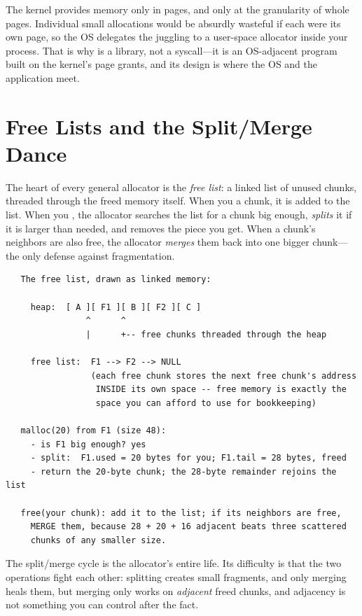 \begin{osconcept}
The kernel provides memory only in pages, and only at the granularity
of whole pages. Individual small allocations would be absurdly wasteful
if each were its own page, so the OS delegates the juggling to a
user-space allocator inside your process. That is why 
is a library, not a syscall---it is an OS-adjacent program built on
the kernel's page grants, and its design is where the OS and the
application meet.
\end{osconcept}

\section{Free Lists and the Split/Merge Dance}

The heart of every general allocator is the \emph{free list}: a linked
list of unused chunks, threaded through the freed memory itself. When
you  a chunk, it is added to the list. When you
, the allocator searches the list for a chunk big enough,
\emph{splits} it if it is larger than needed, and removes the piece
you get. When a chunk's neighbors are also free, the allocator
\emph{merges} them back into one bigger chunk---the only defense
against fragmentation.

\begin{verbatim}
   The free list, drawn as linked memory:

     heap:  [ A ][ F1 ][ B ][ F2 ][ C ]
                ^      ^
                |      +-- free chunks threaded through the heap

     free list:  F1 --> F2 --> NULL
                 (each free chunk stores the next free chunk's address
                  INSIDE its own space -- free memory is exactly the
                  space you can afford to use for bookkeeping)

   malloc(20) from F1 (size 48):
     - is F1 big enough? yes
     - split:  F1.used = 20 bytes for you; F1.tail = 28 bytes, freed
     - return the 20-byte chunk; the 28-byte remainder rejoins the list

   free(your chunk): add it to the list; if its neighbors are free,
     MERGE them, because 28 + 20 + 16 adjacent beats three scattered
     chunks of any smaller size.
\end{verbatim}

The split/merge cycle is the allocator's entire life. Its difficulty
is that the two operations fight each other: splitting creates small
fragments, and only merging heals them, but merging only works on
\emph{adjacent} freed chunks, and adjacency is not something you can
control after the fact.

